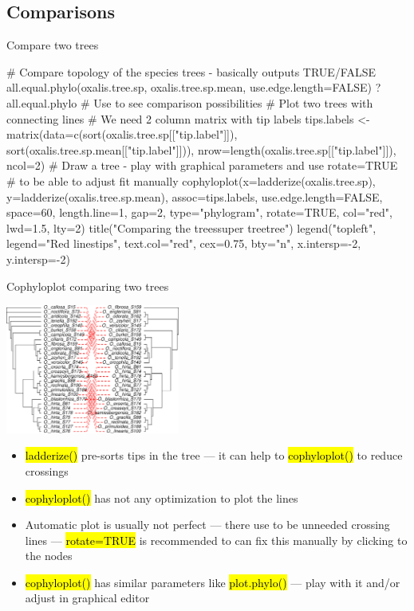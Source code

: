 \documentclass[compress, ucs, xelatex, 11pt, xcolor=svgnames,
  hyperref={
    bookmarks=true,
    unicode=true,
    colorlinks=true,
    pdftitle={Molecular data in R},
    plainpages=false,
    pdfauthor={Vojtech Zeisek},
    pdfsubject={Course about phylogeny and evolution in R},
    pdfcreator={XeLaTeX},
    pdfkeywords={R, evolution, phylogeny, molecular data},
    linkcolor=Tomato,
    anchorcolor=SaddleBrown,
    citecolor=Goldenrod,
    filecolor=DarkMagenta,
    menucolor=Sienna,
    urlcolor=DarkTurquoise,
    pdftex},
  url={hyphens, lowtilde} %
  ]{beamer}
\renewcommand{\texttt}[1]{\hl{\ttfamily #1}}
\begin{document}
\subsection{Comparisons}

\begin{frame}[fragile]{Compare two trees}
  \begin{spluscode}
    # Compare topology of the species trees - basically outputs TRUE/FALSE
    all.equal.phylo(oxalis.tree.sp, oxalis.tree.sp.mean,
      use.edge.length=FALSE)
    ?all.equal.phylo # Use to see comparison possibilities
    # Plot two trees with connecting lines
    # We need 2 column matrix with tip labels
    tips.labels <- matrix(data=c(sort(oxalis.tree.sp[["tip.label"]]),
      sort(oxalis.tree.sp.mean[["tip.label"]])),
      nrow=length(oxalis.tree.sp[["tip.label"]]), ncol=2)
    # Draw a tree - play with graphical parameters and use rotate=TRUE
    # to be able to adjust fit manually
    cophyloplot(x=ladderize(oxalis.tree.sp),
      y=ladderize(oxalis.tree.sp.mean),  assoc=tips.labels,
      use.edge.length=FALSE, space=60, length.line=1, gap=2,
      type="phylogram", rotate=TRUE, col="red", lwd=1.5, lty=2)
    title("Comparing the trees\nParsimony super tree\tSpecies tree")
    legend("topleft", legend="Red lines\nconnect tips", text.col="red",
      cex=0.75, bty="n", x.intersp=-2, y.intersp=-2)
  \end{spluscode}
\end{frame}

\begin{frame}{Cophyloplot comparing two trees}
  \begin{multicols}{2}
    \begin{center}
      \includegraphics[height=4.25cm]{cophyloplot.png}
    \end{center}
    \begin{itemize}
      \item \texttt{ladderize()} pre-sorts tips in the tree --- it can help to \texttt{cophyloplot()} to reduce crossings
      \item \texttt{cophyloplot()} has not any optimization to plot the lines
      \item Automatic plot is usually not perfect --- there use to be unneeded crossing lines --- \texttt{rotate=TRUE} is recommended to can fix this manually by clicking to the nodes
      \item \texttt{cophyloplot()} has similar parameters like \texttt{plot.phylo()} --- play with it and/or adjust in graphical editor
    \end{itemize}
  \end{multicols}
\end{frame}
\end{document}
